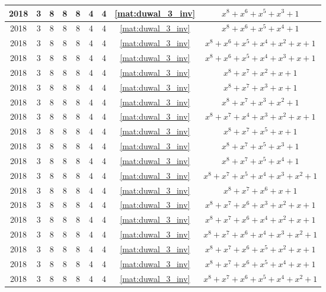 \begin{longtable}{|c|c|c|c|c|c|c|c|c|}
2018 & 3 & 8 & 8 & 8 & 4 & 4 & \eqref{mat:duwal_3_inv} & $x^8 + x^6 + x^5 + x^3 + 1$ \\ \hline 
2018 & 3 & 8 & 8 & 8 & 4 & 4 & \eqref{mat:duwal_3_inv} & $x^8 + x^6 + x^5 + x^4 + 1$ \\ \hline 
2018 & 3 & 8 & 8 & 8 & 4 & 4 & \eqref{mat:duwal_3_inv} & $x^8 + x^6 + x^5 + x^4 + x^2 + x + 1$ \\ \hline 
2018 & 3 & 8 & 8 & 8 & 4 & 4 & \eqref{mat:duwal_3_inv} & $x^8 + x^6 + x^5 + x^4 + x^3 + x + 1$ \\ \hline 
2018 & 3 & 8 & 8 & 8 & 4 & 4 & \eqref{mat:duwal_3_inv} & $x^8 + x^7 + x^2 + x + 1$ \\ \hline 
2018 & 3 & 8 & 8 & 8 & 4 & 4 & \eqref{mat:duwal_3_inv} & $x^8 + x^7 + x^3 + x + 1$ \\ \hline 
2018 & 3 & 8 & 8 & 8 & 4 & 4 & \eqref{mat:duwal_3_inv} & $x^8 + x^7 + x^3 + x^2 + 1$ \\ \hline 
2018 & 3 & 8 & 8 & 8 & 4 & 4 & \eqref{mat:duwal_3_inv} & $x^8 + x^7 + x^4 + x^3 + x^2 + x + 1$ \\ \hline 
2018 & 3 & 8 & 8 & 8 & 4 & 4 & \eqref{mat:duwal_3_inv} & $x^8 + x^7 + x^5 + x + 1$ \\ \hline 
2018 & 3 & 8 & 8 & 8 & 4 & 4 & \eqref{mat:duwal_3_inv} & $x^8 + x^7 + x^5 + x^3 + 1$ \\ \hline 
2018 & 3 & 8 & 8 & 8 & 4 & 4 & \eqref{mat:duwal_3_inv} & $x^8 + x^7 + x^5 + x^4 + 1$ \\ \hline 
2018 & 3 & 8 & 8 & 8 & 4 & 4 & \eqref{mat:duwal_3_inv} & $x^8 + x^7 + x^5 + x^4 + x^3 + x^2 + 1$ \\ \hline 
2018 & 3 & 8 & 8 & 8 & 4 & 4 & \eqref{mat:duwal_3_inv} & $x^8 + x^7 + x^6 + x + 1$ \\ \hline 
2018 & 3 & 8 & 8 & 8 & 4 & 4 & \eqref{mat:duwal_3_inv} & $x^8 + x^7 + x^6 + x^3 + x^2 + x + 1$ \\ \hline 
2018 & 3 & 8 & 8 & 8 & 4 & 4 & \eqref{mat:duwal_3_inv} & $x^8 + x^7 + x^6 + x^4 + x^2 + x + 1$ \\ \hline 
2018 & 3 & 8 & 8 & 8 & 4 & 4 & \eqref{mat:duwal_3_inv} & $x^8 + x^7 + x^6 + x^4 + x^3 + x^2 + 1$ \\ \hline 
2018 & 3 & 8 & 8 & 8 & 4 & 4 & \eqref{mat:duwal_3_inv} & $x^8 + x^7 + x^6 + x^5 + x^2 + x + 1$ \\ \hline 
2018 & 3 & 8 & 8 & 8 & 4 & 4 & \eqref{mat:duwal_3_inv} & $x^8 + x^7 + x^6 + x^5 + x^4 + x + 1$ \\ \hline 
2018 & 3 & 8 & 8 & 8 & 4 & 4 & \eqref{mat:duwal_3_inv} & $x^8 + x^7 + x^6 + x^5 + x^4 + x^2 + 1$ \\ \hline 

\end{longtable}
